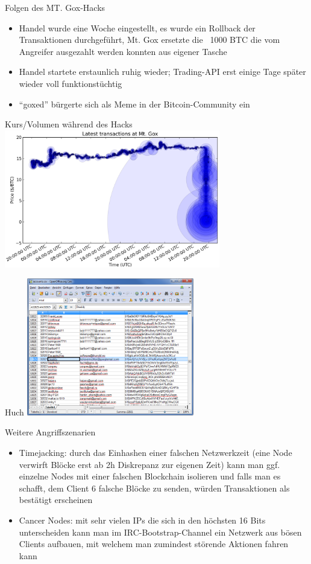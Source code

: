 \documentclass[handout]{beamer} \usepackage[german]{babel}
\begin{document}
\begin{frame}
	{Folgen des MT. Gox-Hacks}
	\begin{itemize}
		\item Handel wurde eine Woche eingestellt, es wurde ein Rollback der
			Transaktionen durchgeführt, Mt. Gox ersetzte die ~1000 BTC die vom
			Angreifer ausgezahlt werden konnten aus eigener Tasche
		\item Handel startete erstaunlich ruhig wieder; Trading-API erst einige
			Tage später wieder voll funktionstüchtig
		\item "`goxed"' bürgerte sich als Meme in der Bitcoin-Community ein
	\end{itemize}
\end{frame}

\begin{frame}{Kurs/Volumen während des Hacks}
	\includegraphics[height=60mm]{btcvortrag/mtgox-crash.png}
\end{frame}

\begin{frame}{Huch}
	\includegraphics[height=60mm]{btcvortrag/MtGoxLeakDeaddy.png}
\end{frame}

\begin{frame}
	{Weitere Angriffszenarien}
	\begin{itemize}
		\item Timejacking: durch das Einhashen einer falschen Netzwerkzeit (eine
			Node verwirft Blöcke erst ab 2h Diskrepanz zur eigenen Zeit) kann man
			ggf. einzelne Nodes mit einer falschen Blockchain isolieren und falls
			man es schafft, dem Client 6 falsche Blöcke zu senden, würden
			Transaktionen als bestätigt erscheinen
		\item Cancer Nodes: mit sehr vielen IPs die sich in den höchsten 16 Bits
			unterscheiden kann man im IRC-Bootstrap-Channel ein Netzwerk aus bösen
			Clients aufbauen, mit welchem man zumindest störende Aktionen fahren
			kann
	\end{itemize}
\end{frame}
\end{document}

